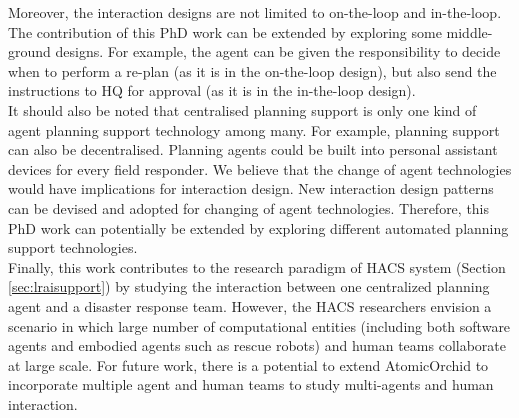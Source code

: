 Moreover, the interaction designs are not limited to on-the-loop and in-the-loop. The contribution of this PhD work can be extended by exploring some middle-ground designs. For example, the agent can be given the responsibility to decide when to perform a re-plan (as it is in the on-the-loop design), but also send the instructions to HQ for approval (as it is in the in-the-loop design).\\

It should also be noted that centralised planning support is only one kind of agent planning support technology among many. For example, planning support can also be decentralised. Planning agents could be built into personal assistant devices for every field responder. We believe that the change of agent technologies would have implications for interaction design. New interaction design patterns can be devised and adopted for changing of agent technologies. Therefore, this PhD work can potentially be extended by exploring different automated planning support technologies.\\ 

Finally, this work contributes to the research paradigm of \acf{HACS} system (Section \ref{sec:lraisupport}) by studying the interaction between one centralized planning agent and a disaster response team. However, the \ac{HACS} researchers envision a scenario in which large number of computational entities (including both software agents and embodied agents such as rescue robots) and human teams collaborate at large scale. For future work, there is a potential to extend AtomicOrchid to incorporate multiple agent and human teams to study multi-agents and human interaction.\\




